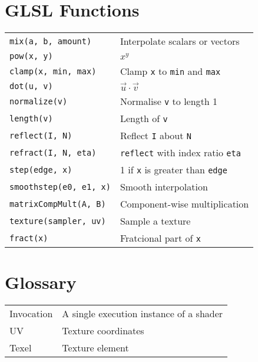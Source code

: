 \documentclass{article}
\begin{document}
\begin{landscape}
\begin{multicols}{3}
            \section{GLSL Functions}
            \begin{small}
                \begin{tabular}{l l}
                    \texttt{mix(a, b, amount)} & Interpolate scalars or vectors \\
                    \texttt{pow(x, y)} & $x^y$ \\
                    \texttt{clamp(x, min, max)} & Clamp \texttt{x} to \texttt{min} and \texttt{max} \\
                    \texttt{dot(u, v)} & $\vec u \cdot \vec v$ \\
                    \texttt{normalize(v)} & Normalise \texttt{v} to length 1 \\
                    \texttt{length(v)} & Length of \texttt{v} \\
                    \texttt{reflect(I, N)} & Reflect \texttt{I} about \texttt{N} \\
                    \texttt{refract(I, N, eta)} & \texttt{reflect} with index ratio \texttt{eta} \\
                    \texttt{step(edge, x)} & 1 if \texttt{x} is greater than \texttt{edge} \\
                    \texttt{smoothstep(e0, e1, x)} & Smooth interpolation \\
                    \texttt{matrixCompMult(A, B)} & Component-wise multiplication \\
                    \texttt{texture(sampler, uv)} & Sample a texture \\
                    \texttt{fract(x)} & Fratcional part of \texttt{x} \\
                \end{tabular}
            \end{small}
            \section{Glossary}
            \begin{tabular}
                {l l}
                Invocation & A single execution instance of a shader \\
                UV & Texture coordinates \\
                Texel & Texture element \\
            \end{tabular}


\end{multicols}
\end{landscape}
\end{document}
